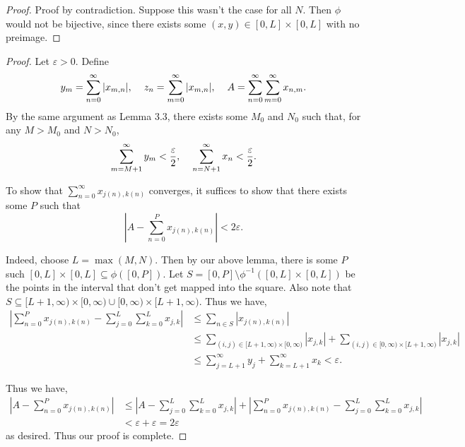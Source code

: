 \documentclass[12pt]{article}
\theoremstyle{remark}
\theoremstyle{named}
\newcommand{\e}{\varepsilon}
\newcommand{\bigabs}[1]{\left|#1\right|}
\begin{document}
\begin{proof}
    Proof by contradiction. Suppose this wasn't the case for all \(N\). Then \(\phi\) would not be bijective, since there exists some \((x, y) \in [0, L] \times [0, L]\) with no preimage.
\end{proof}

\begin{proof}
    Let \(\e > 0\). Define 
    \[y_m = \sum_{n = 0}^\infty|x_{m, n}|, \hspace*{4mm} z_n = \sum_{m = 0}^\infty |x_{m, n}|, \hspace{4mm} A = \sum_{n = 0}^\infty \sum_{m = 0}^\infty x_{n, m}.\]
    By the same argument as Lemma 3.3, there exists some \(M_0\) and \(N_0\) such that, for any \(M > M_0\) and \(N > N_0\),
    \[\sum_{m = M + 1}^\infty y_m < \frac{\e}{2}, \hspace*{4mm} \sum_{n = N + 1}^\infty x_n < \frac{\e}{2}.\]

    To show that \(\sum_{n = 0}^\infty x_{j(n), k(n)}\) converges, it suffices to show that there exists some \(P\) such that
    \[\bigabs{A - \sum_{n = 0}^P x_{j(n), k(n)}} < 2 \e.\]

    Indeed, choose \(L = \max(M, N)\). Then by our above lemma, there is some \(P\) such \([0, L] \times [0, L] \subseteq \phi([0, P])\). Let \(S = [0, P] \setminus \phi^{-1}([0, L] \times [0, L])\) be the points in the interval that don't get mapped into the square. Also note that \(S \subseteq [L + 1, \infty) \times [0, \infty) \cup [0, \infty) \times [L + 1, \infty)\). Thus we have, 
    \begin{align*}
        \bigabs{\sum_{n = 0}^P x_{j(n), k(n)} - \sum_{j = 0}^L \sum_{k = 0}^L x_{j, k}} &\leq \sum_{n \in S} |x_{j(n), k(n)}| \\
        &\leq \sum_{(i, j) \in [L + 1, \infty) \times [0, \infty)} |x_{j, k}| + \sum_{(i, j) \in [0, \infty) \times [L + 1, \infty)} |x_{j, k}| \\
        &\leq \sum_{j = L + 1}^\infty y_j + \sum_{k = L + 1}^\infty x_k < \e.
    \end{align*}

    Thus we have, 
    \begin{align*}
        \bigabs{A - \sum_{n = 0}^P x_{j(n), k(n)}} &\leq \bigabs{A - \sum_{j = 0}^L \sum_{k = 0}^L x_{j, k}} + \bigabs{\sum_{n = 0}^P x_{j(n), k(n)} - \sum_{j = 0}^L \sum_{k = 0}^L x_{j, k}} \\
        &< \e + \e = 2\e
    \end{align*}
    as desired. Thus our proof is complete.
\end{proof}
\end{document}
